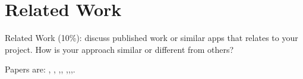 \section{Related Work}
Related Work (10\%): discuss published work or similar apps that relates to your project. How is your approach similar or different from others?

Papers are: \cite{chromagan}, \cite{su}, \cite{zhang},\cite{siggraph}, \cite{dahl},\cite{animation},\cite{cartoonize},\cite{language}.
